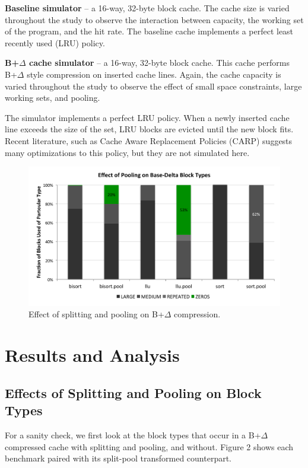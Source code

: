 \documentclass[pageno]{jpaper}
\begin{document}
\textbf{Baseline simulator} -- a 16-way, 32-byte block cache. The cache size is varied throughout the study to observe the interaction between capacity, the working set of the program, and the hit rate. The baseline cache implements a perfect least recently used (LRU) policy.

\textbf{B+$\Delta$ cache simulator} -- a 16-way, 32-byte block cache. This cache performs B+$\Delta$ style compression on inserted cache lines. Again, the cache capacity is varied throughout the study to observe the effect of small space constraints, large working sets, and pooling.

The simulator implements a perfect LRU policy. When a newly inserted cache line exceeds the size of the set, LRU blocks are evicted until the new block fits. Recent literature, such as Cache Aware Replacement Policies\cite{carp} (CARP) suggests many optimizations to this policy, but they are not simulated here.

\begin{figure}[bp]
  \centering
    \includegraphics[width=\linewidth]{pooling-effect.pdf}
  \caption{Effect of splitting and pooling on B+$\Delta$ compression.}
\end{figure}

\section{Results and Analysis}

\subsection{Effects of Splitting and Pooling on Block Types}
For a sanity check, we first look at the block types that occur in a B+$\Delta$ compressed cache with splitting and pooling, and without. Figure 2 shows each benchmark paired with its split-pool transformed counterpart.
\end{document}
